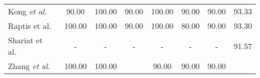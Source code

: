 \documentclass[9pt,journal,letterpaper,twocolumn]{IEEEtran}
\begin{document}
\begin{table}[!t]
{\begin{center}
\begin{tabular}{lc cc cccc}
					\hspace{-0.5em}Kong {\em et al.}~\cite{kong2016close} & \hspace{-0.5em}90.00\hspace{-0.5em} & \hspace{-0.5em}100.00\hspace{-0.5em} & \hspace{-0.5em}90.00\hspace{-0.5em} & \hspace{-0.5em}100.00\hspace{-0.5em} & \hspace{-0.5em}90.00\hspace{-0.5em} & \hspace{-0.5em}90.00\hspace{-0.5em} & \hspace{-0.5em}93.33\hspace{-0.5em}  \\
					\hspace{-0.5em}Raptis et al.~\cite{raptis2013poselet} & \hspace{-0.5em}100.00\hspace{-0.5em} & \hspace{-0.5em}100.00\hspace{-0.5em} & \hspace{-0.5em}90.00\hspace{-0.5em} & \hspace{-0.5em}100.00\hspace{-0.5em} & \hspace{-0.5em}80.00\hspace{-0.5em} & \hspace{-0.5em}90.00\hspace{-0.5em} & \hspace{-0.5em}93.30\hspace{-0.5em} \\
					\hspace{-0.5em}Shariat et al.~\cite{shariat2013a} & - & - & - & - & - & - & 91.57 \\
					\hspace{-0.5em}Zhang {\em et al.}~\cite{zhang2012spatio} & \hspace{-0.5em}100.00\hspace{-0.5em} & \hspace{-0.5em}100.00\hspace{-0.5em} & \hspace{-0.5em}{100.00}\hspace{-0.5em}  & \hspace{-0.5em}90.00\hspace{-0.5em} & \hspace{-0.5em}90.00\hspace{-0.5em} & \hspace{-0.5em}90.00\hspace{-0.5em} & \hspace{-0.5em}{95.00}\hspace{-0.5em} \\

\end{tabular}
\end{center}}
\end{table}
\end{document}
